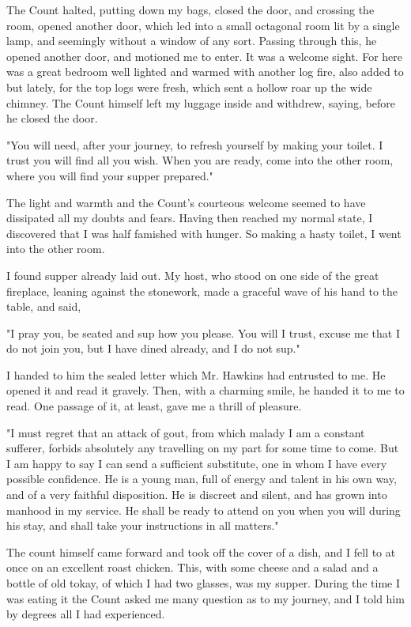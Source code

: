 The Count halted, putting down my bags, closed the door, and crossing the room, opened another door, which led into a small octagonal room lit by a single lamp, and seemingly without a window of any sort. Passing through this, he opened another door, and motioned me to enter. It was a welcome sight. For here was a great bedroom well lighted and warmed with another log fire, also added to but lately, for the top logs were fresh, which sent a hollow roar up the wide chimney. The Count himself left my luggage inside and withdrew, saying, before he closed the door. 

"You will need, after your journey, to refresh yourself by making your toilet. I trust you will find all you wish. When you are ready, come into the other room, where you will find your supper prepared." 

The light and warmth and the Count's courteous welcome seemed to have dissipated all my doubts and fears. Having then reached my normal state, I discovered that I was half famished with hunger. So making a hasty toilet, I went into the other room. 

I found supper already laid out. My host, who stood on one side of the great fireplace, leaning against the stonework, made a graceful wave of his hand to the table, and said, 

"I pray you, be seated and sup how you please. You will I trust, excuse me that I do not join you, but I have dined already, and I do not sup." 

I handed to him the sealed letter which Mr. Hawkins had entrusted to me. He opened it and read it gravely. Then, with a charming smile, he handed it to me to read. One passage of it, at least, gave me a thrill of pleasure. 

"I must regret that an attack of gout, from which malady I am a constant sufferer, forbids absolutely any travelling on my part for some time to come. But I am happy to say I can send a sufficient substitute, one in whom I have every possible confidence. He is a young man, full of energy and talent in his own way, and of a very faithful disposition. He is discreet and silent, and has grown into manhood in my service. He shall be ready to attend on you when you will during his stay, and shall take your instructions in all matters." 

The count himself came forward and took off the cover of a dish, and I fell to at once on an excellent roast chicken. This, with some cheese and a salad and a bottle of old tokay, of which I had two glasses, was my supper. During the time I was eating it the Count asked me many question as to my journey, and I told him by degrees all I had experienced. 

